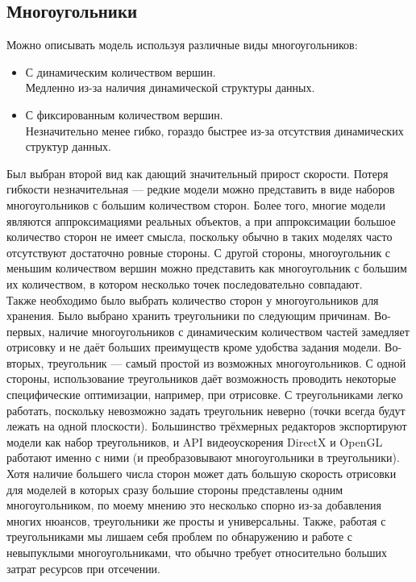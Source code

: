 \documentclass[a4paper,12pt]{report}
\begin{document}
\subsection{Многоугольники}
Можно описывать модель используя различные виды многоугольников:
\begin{itemize}
\item С динамическим количеством вершин. \\
Медленно из-за наличия динамической структуры данных.
\item С фиксированным количеством вершин. \\
Незначительно менее гибко, гораздо быстрее из-за отсутствия динамических структур данных.
\end{itemize}
Был выбран второй вид как дающий значительный прирост скорости. Потеря гибкости незначительная --- редкие модели можно представить в виде наборов многоугольников с большим количеством сторон. Более того, многие модели являются аппроксимациями реальных объектов, а при аппроксимации большое количество сторон не имеет смысла, поскольку обычно в таких моделях часто отсутствуют достаточно ровные стороны. С другой стороны, многоугольник с меньшим количеством вершин можно представить как многоугольник с большим их количеством, в котором несколько точек последовательно совпадают. \\
Также необходимо было выбрать количество сторон у многоугольников для хранения. Было выбрано хранить треугольники по следующим причинам. Во-первых, наличие многоугольников с динамическим количеством частей замедляет отрисовку и не даёт больших преимуществ кроме удобства задания модели. Во-вторых, треугольник --- самый простой из возможных многоугольников. С одной стороны, использование треугольников даёт возможность проводить некоторые специфические оптимизации, например, при отрисовке. С треугольниками легко работать, поскольку невозможно задать треугольник неверно (точки всегда будут лежать на одной плоскости). Большинство трёхмерных редакторов экспортируют модели как набор треугольников, и API видеоускорения DirectX и OpenGL работают именно с ними (и преобразовывают многоугольники в треугольники). Хотя наличие большего числа сторон может дать большую скорость отрисовки для моделей в которых сразу большие стороны представлены одним многоугольником, по моему мнению это несколько спорно из-за добавления многих нюансов, треугольники же просты и универсальны. Также, работая с треугольниками мы лишаем себя проблем по обнаружению и работе с невыпуклыми многоугольниками, что обычно требует относительно больших затрат ресурсов при отсечении.
\end{document}
